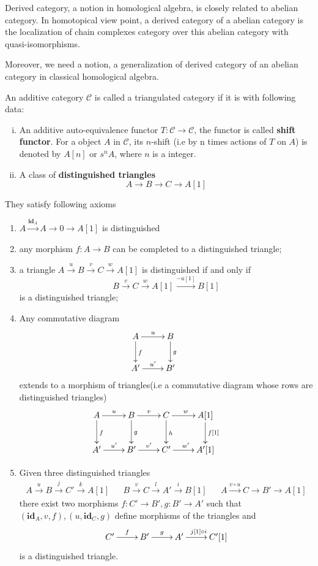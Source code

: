 Derived category, a notion in homological algebra, is closely related to abelian category. In homotopical view point, a derived category of a abelian category is the localization of chain complexes category over this abelian category with quasi-isomorphisms.
\par
Moreover, we need a notion, a generalization of derived category of an abelian category in classical homological algebra.
\begin{mydefn}
An additive category $\mathcal{C}$ is called a triangulated category if it is with following data:
\begin{enumerate}[(i)]
    \item An additive auto-equivalence functor $T : \mathcal{C}\rightarrow \mathcal{C}$, the functor is called \textbf{shift functor}. For a object $A$ in $\mathcal{C}$, its $n$-shift (i.e by n times actions of $T$ on $A$) is denoted by $A[n]$ or $s^{n}A$, where $n$ is a integer. 
    \item A class of \textbf{distinguished triangles}
    \[
    A \rightarrow B \rightarrow C \rightarrow A[1]
    \]
\end{enumerate}
They satisfy following axioms
\begin{enumerate}[TR1]
    \item $A \xrightarrow{\textbf{id}_{A}} A \rightarrow 0 \rightarrow A[1]$ is distinguished
    \item any morphism $f: A \rightarrow B$ can be completed to a distinguished triangle;
    \item a triangle $A \xrightarrow{u} B \xrightarrow{v} C \xrightarrow{w} A[1]$ is distinguished if and only if 
    \[
    B \xrightarrow{v} C \xrightarrow{w} A[1] \xrightarrow{-u[1]} B[1]
    \]
    is a distinguished triangle;
    \item Any commutative diagram
    \[
    \xymatrix{
    A \ar[r]^{u} \ar[d]^{f} &B \ar[d]^{g} &\\
    A' \ar[r]^{u'}& B' &
    }\]
    extends to a morphism of triangles(i.e a commutative diagram whose rows are distinguished triangles)
    \[
    \xymatrix{
    A \ar[r]^{u} \ar[d]^{f} & B \ar[r]^{v} \ar[d]^{g} & C \ar[r]^{w} \ar[d]^{h} & A[1] \ar[d]^{f[1]}&\\
    A' \ar[r]^{u'}& B' \ar[r]^{v'} & C' \ar[r]^{w'} & A'[1]
    }\]
    \item Given three distinguished triangles
    \begin{align*}
        A \xrightarrow{u} B \xrightarrow{j} C' \xrightarrow{k} A[1]& &B \xrightarrow{v} C \xrightarrow{l} A' \xrightarrow{i} B[1]& &A \xrightarrow{v \circ u} C \rightarrow B' \rightarrow A[1]
    \end{align*}
    there exist two morphisms $f: C' \rightarrow B', g: B' \rightarrow A'$ such that$(\textbf{id}_{A},v,f),(u,\textbf{id}_{C},g)$ define morphisms of the triangles and \[
    \xymatrix{C' \ar[r]^{f} &B' \ar[r]^{g} & A' \ar[r]^{j[1] \circ i}& C'[1]}
    \]
    is a distinguished triangle.
\end{enumerate}
\end{mydefn}

